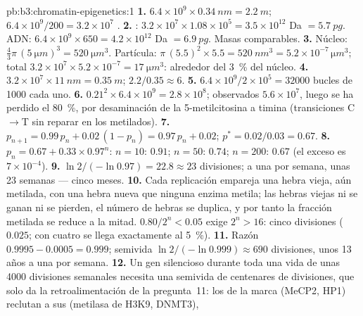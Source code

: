 \begin{solution}{pb:b3:chromatin-epigenetics:1}
\textbf{1.} $6.4\times 10^{9}\times \qty{0.34}{nm} = \qty{2.2}{m}$;
$6.4\times 10^{9}/200 = 3.2\times 10^{7}$ .
\textbf{2.} : $3.2\times 10^{7}\times 1.08\times 10^{5} =
3.5\times 10^{12}$ Da $= \qty{5.7}{pg}$. ADN: $6.4\times 10^{9}\times
650 = 4.2\times 10^{12}$ Da $= \qty{6.9}{pg}$. Masas comparables.
\textbf{3.} Núcleo: $\tfrac{4}{3}\pi\,(\qty{5}{\micro m})^{3} =
\qty{520}{\micro m^3}$. Partícula: $\pi\,(5.5)^{2}\times 5.5 =
\qty{520}{nm^3} = 5.2\times 10^{-7}\,\unit{\micro m^3}$; total
$3.2\times 10^{7}\times 5.2\times 10^{-7} = \qty{17}{\micro m^3}$:
alrededor del \qty{3}{\%} del núcleo.
\textbf{4.} $3.2\times 10^{7}\times \qty{11}{nm} = \qty{0.35}{m}$;
 $2.2/0.35 \approx 6$.
\textbf{5.} $6.4\times 10^{9}/2\times 10^{5} = \num{32000}$ bucles de
\num{1000}  cada uno.
\textbf{6.} $0.21^{2}\times 6.4\times 10^{9} = 2.8\times 10^{8}$;
observados $5.6\times 10^{7}$, luego se ha perdido el \qty{80}{\%}, por
desaminación de la 5-metilcitosina a timina (transiciones C$\to$T sin
reparar en los  metilados).
\textbf{7.} $p_{n+1} = 0.99\,p_{n} + 0.02\,(1 - p_{n}) = 0.97\,p_{n} +
0.02$; $p^{*} = 0.02/0.03 = 0.67$.
\textbf{8.} $p_{n} = 0.67 + 0.33\times 0.97^{n}$: $n = 10$: $0.91$;
$n = 50$: $0.74$; $n = 200$: $0.67$ (el exceso es $7\times 10^{-4}$).
\textbf{9.} $\ln 2/(-\ln 0.97) = 22.8 \approx 23$ divisiones; a una por
semana, unas \num{23} semanas --- cinco meses.
\textbf{10.} Cada replicación empareja una hebra vieja, aún metilada, con
una hebra nueva que ninguna enzima metila; las hebras viejas ni se ganan
ni se pierden, el número de hebras se duplica, y por tanto la fracción
metilada se reduce a la mitad. $0.80/2^{n} < 0.05$ exige $2^{n} > 16$:
cinco divisiones ($0.025$; con cuatro se llega exactamente al
\qty{5}{\%}).
\textbf{11.} Razón $0.9995 - 0.0005 = 0.999$; semivida $\ln
2/(-\ln 0.999) \approx 690$ divisiones, unos \num{13} años a una por
semana.
\textbf{12.} Un gen silencioso durante toda una vida de unas \num{4000}
divisiones semanales necesita una semivida de centenares de divisiones,
que solo da la retroalimentación de la pregunta~11: los  de la
marca (MeCP2, HP1) reclutan a sus  (metilasa de H3K9, DNMT3),

\end{solution}

